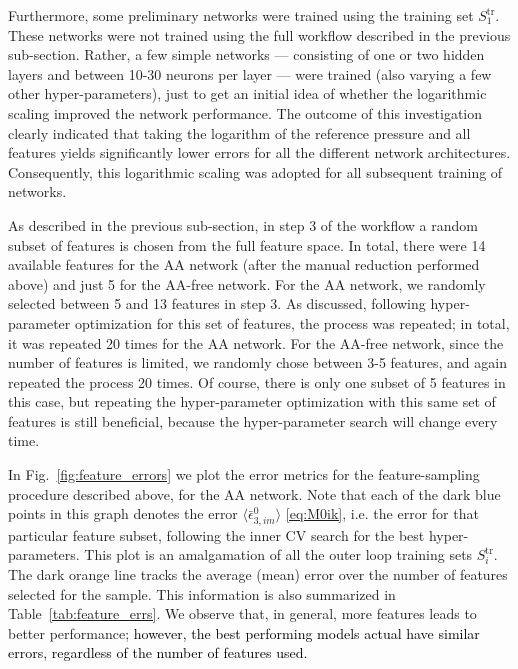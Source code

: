\documentclass[%
 preprint,
 superscriptaddress,
 amsmath,amssymb,
longbibliography,
]{revtex4-2}
\newcommand{\change}[1]{\textcolor{black}{#1}}
\newcommand{\avg}[1]{\langle #1 \rangle}
\begin{document}
Furthermore, some preliminary networks were trained using the training set $S^\textrm{tr}_1$. These networks were not trained using the full workflow described in the previous sub-section. Rather, a few simple networks --- consisting of one or two hidden layers and between 10-30 neurons per layer --- were trained (also varying a few other hyper-parameters), just to get an initial idea of whether the logarithmic scaling improved the network performance. The outcome of this investigation clearly indicated that taking the logarithm of the reference pressure and all features yields significantly lower errors for all the different network architectures. Consequently, this logarithmic scaling was adopted for all subsequent training of networks.

As described in the previous sub-section, in step 3 of the workflow a random subset of features is chosen from the full feature space. In total, there were 14 available features for the AA network (after the manual reduction performed above) and just 5 for the AA-free network. For the AA network, we randomly selected between 5 and 13 features in step 3. As discussed, following hyper-parameter optimization for this set of features, the process was repeated; in total, it was repeated 20 times for the AA network. For the AA-free network, since the number of features is limited, we randomly chose between 3-5 features, and again repeated the process 20 times. Of course, there is only one subset of 5 features in this case, but repeating the hyper-parameter optimization with this same set of features is still beneficial, because the hyper-parameter search will change every time.

In Fig.~\ref{fig:feature_errors} we plot the error metrics for the feature-sampling procedure described above, for the AA network. Note that each of the dark blue points in this graph denotes the error $\avg{\bar{\epsilon}_{3,im}^0}$ \eqref{eq:M0ik}, i.e. the error for that particular feature subset, following the inner CV search for the best hyper-parameters. This plot is an amalgamation of all the outer loop training sets $S_i^\textrm{tr}$. The dark orange line tracks the average (mean) error over the number of features selected for the sample. This information is also summarized in Table~\ref{tab:feature_errs}. We observe that, in general, more features leads to better performance; \change{however, the best performing models actual have similar errors, regardless of the number of features used.}
\end{document}
